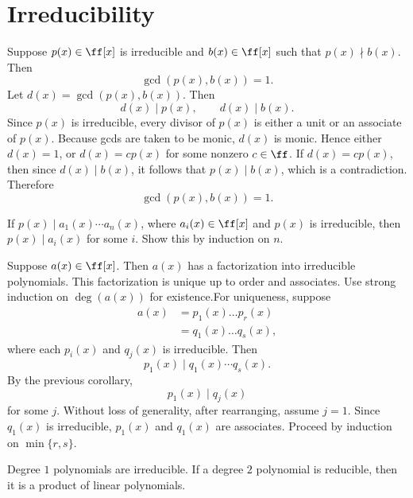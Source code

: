 
\section{Irreducibility}

\begin{proposition}{
    Suppose $p(x)\in\ff[x]$ is irreducible and $b(x)\in\ff[x]$ such that $p(x)\nmid b(x)$.
    Then
    \[
        \gcd(p(x),b(x))=1.
    \]
}
    Let $d(x)=\gcd(p(x),b(x))$.
    Then
    \[
        d(x)\mid p(x), \qquad d(x)\mid b(x).
    \]
    Since $p(x)$ is irreducible, every divisor of $p(x)$ is either a unit or an associate of $p(x)$.
    Because gcds are taken to be monic, $d(x)$ is monic.
    Hence either $d(x)=1$, or $d(x)=cp(x)$ for some nonzero $c\in\ff$.
    If $d(x)=cp(x)$, then since $d(x)\mid b(x)$, it follows that $p(x)\mid b(x)$, which is a contradiction.
    Therefore
    \[
        \gcd(p(x),b(x))=1.
    \]
\end{proposition}

\begin{corollary}{
    If $p(x)\mid a_1(x)\cdots a_n(x)$, where $a_i(x)\in\ff[x]$ and $p(x)$ is irreducible, then $p(x)\mid a_i(x)$ for some $i$.
}
    Show this by induction on $n$.
\end{corollary}

\begin{theorem}{
    Suppose $a(x)\in\ff[x]$.
    Then $a(x)$ has a factorization into irreducible polynomials.
    This factorization is unique up to order and associates.
}
Use strong induction on $\deg(a(x))$ for existence.For uniqueness, suppose
\begin{align*}
    a(x) &= p_1(x)\hdots p_r(x)\\
    &= q_1(x)\hdots q_s(x),
\end{align*}
where each $p_i(x)$ and $q_j(x)$ is irreducible.
Then
\[
    p_1(x)\mid q_1(x)\cdots q_s(x).
\]
By the previous corollary,
\[
    p_1(x)\mid q_j(x)
\]
for some $j$.
Without loss of generality, after rearranging, assume $j=1$.
Since $q_1(x)$ is irreducible, $p_1(x)$ and $q_1(x)$ are associates.
Proceed by induction on $\min\{r,s\}$.
\end{theorem}

\begin{lemma*}{
    Degree $1$ polynomials are irreducible.
    If a degree $2$ polynomial is reducible, then it is a product of linear polynomials.
}
\end{lemma*}

